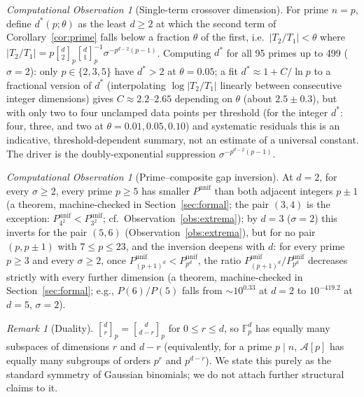 \documentclass[11pt,a4paper]{article}
\theoremstyle{remark}
\newtheorem{remark}[theorem]{Remark}
\newtheorem{observation}[theorem]{Computational Observation}
\newcommand{\FF}{\mathbb{F}}
\newcommand{\A}{\mathcal{A}}
\newcommand{\gaussbinom}[2]{\genfrac{[}{]}{0pt}{}{#1}{#2}}
\begin{document}
\begin{observation}[Single-term crossover dimension]\label{obs:dstar}
For prime $n=p$, define $d^*(p;\theta)$ as the least $d\ge2$ at which the
second term of Corollary~\ref{cor:prime} falls below a fraction $\theta$
of the first, i.e.\ $|T_2/T_1|<\theta$ where
$|T_2/T_1| = p\gaussbinom d2_p\gaussbinom d1_p^{-1}
\sigma^{-p^{d-2}(p-1)}$. Computing $d^*$ for all 95 primes up to 499
($\sigma=2$): only $p\in\{2,3,5\}$ have $d^*>2$ at $\theta=0.05$; a fit
$d^*\approx1+C/\ln p$ to a fractional version of $d^*$ (interpolating
$\log|T_2/T_1|$ linearly between consecutive integer dimensions) gives
$C\approx2.2$--$2.65$ depending on $\theta$
(about $2.5\pm0.3$), but with only two to four unclamped data points per
threshold (for the integer $d^*$: four, three, and two at
$\theta=0.01,0.05,0.10$) and
systematic residuals this is an indicative, threshold-dependent summary,
not an estimate of a universal constant. The driver is the
doubly-exponential suppression $\sigma^{-p^{d-2}(p-1)}$.
\end{observation}

\begin{observation}[Prime--composite gap inversion]\label{obs:inversion}
At $d=2$, for every $\sigma\ge2$, every prime $p\ge5$ has smaller
$P^{\mathrm{unif}}$ than both adjacent integers $p\pm1$ (a theorem,
machine-checked in Section~\ref{sec:formal}; the pair $(3,4)$
is the exception: $P^{\mathrm{unif}}_{4^2}<P^{\mathrm{unif}}_{3^2}$;
cf.\ Observation~\ref{obs:extrema}); by $d=3$ ($\sigma=2$) this inverts for the pair $(5,6)$
(Observation~\ref{obs:extrema}), but for no pair $(p,p\pm1)$ with
$7\le p\le23$, and the inversion deepens with $d$: for every prime $p\ge3$ and every
$\sigma\ge2$, once $P^{\mathrm{unif}}_{(p+1)^d}<P^{\mathrm{unif}}_{p^d}$,
the ratio $P^{\mathrm{unif}}_{(p+1)^d}/P^{\mathrm{unif}}_{p^d}$ decreases
strictly with every further dimension (a theorem, machine-checked in
Section~\ref{sec:formal}; e.g., $P(6)/P(5)$ falls from ${\sim}10^{0.33}$ at $d=2$ to
$10^{-419.2}$ at $d=5$, $\sigma=2$).
\end{observation}

\begin{remark}[Duality]
$\gaussbinom dr_p=\gaussbinom d{d-r}_p$ for $0\le r\le d$, so $\FF_p^d$
has equally many subspaces of dimensions $r$ and $d-r$ (equivalently, for
a prime $p\mid n$, $\A[p]$ has equally many subgroups of orders $p^r$ and
$p^{d-r}$). We state this purely as the standard
symmetry of Gaussian binomials; we do not attach further structural
claims to it.
\end{remark}
\end{document}
